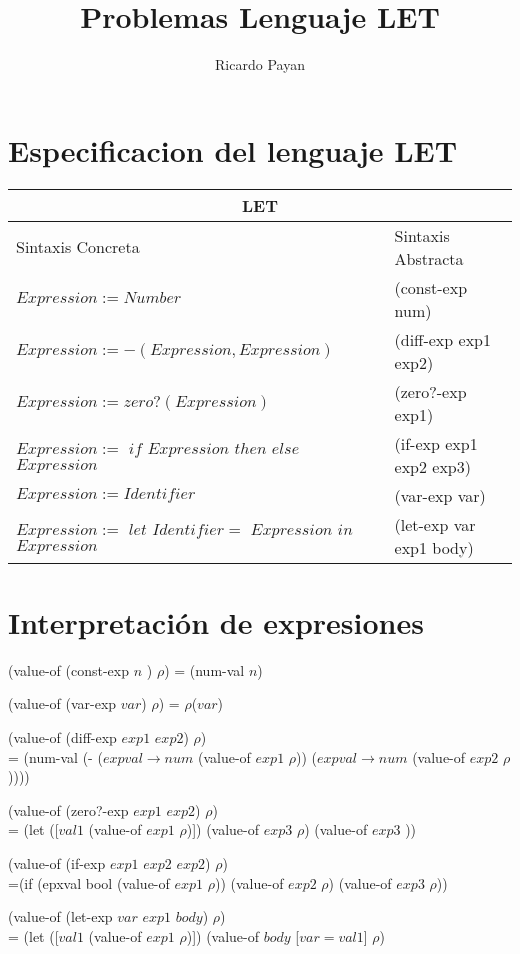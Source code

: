 \documentclass{article}
\title{ Problemas Lenguaje LET}
\author{Ricardo Payan}
\begin{document}
\maketitle

\section*{Especificacion del lenguaje LET}
\begin{tabular}{| p{6cm} | p{6cm} |}
\hline
 \multicolumn{2}{|c|}{LET} \\
 
 \hline
    Sintaxis Concreta & Sintaxis Abstracta \\
\hline
$Expression := Number$ & (const-exp num) \\
\hline

\hline
$Expression := -(Expression, Expression)$ & (diff-exp exp1 exp2) \\
\hline

\hline
$Expression := zero?(Expression)$ & (zero?-exp exp1) \\
\hline

\hline
$Expression :=$ $if$ $Expression$ $then$ $else$ $Expression$ & (if-exp exp1 exp2 exp3) \\
\hline

\hline
$Expression := Identifier$ & (var-exp var) \\
\hline

\hline
$Expression :=$ $let$ $Identifier=$ $Expression$ $in$ $Expression$ & (let-exp var exp1 body) \\
\hline
 
\end{tabular}

\section*{Interpretación de expresiones}
(value-of (const-exp $n$ ) $\rho$) = (num-val $n$)

(value-of (var-exp $var$) $\rho$) = $\rho$($var$)

(value-of (diff-exp $exp1$ $exp2$) $\rho$) \\
   = (num-val (- ($expval \rightarrow num$ (value-of $exp1$ $\rho$))
    ($expval \rightarrow num$ (value-of $exp2$ $\rho$))))

    
(value-of (zero?-exp $exp1$ $exp2$) $\rho$) \\
    = (let ([$val1$ (value-of $exp1$ $\rho$)])
    (value-of $exp3$ $\rho$)
    (value-of $exp3$ ))

(value-of (if-exp $exp1$ $exp2$ $exp2$) $\rho$) \\
    =(if (epxval \rightarrow bool (value-of $exp1$  $\rho$))
    (value-of $exp2$ $\rho$)
    (value-of $exp3$ $\rho$))

(value-of (let-exp $var$ $exp1$ $body$) $\rho$) \\
    = (let ([$val1$ (value-of $exp1$ $\rho$)])
        (value-of $body$ [$var=val1$] $\rho$)
    
\end{document}
